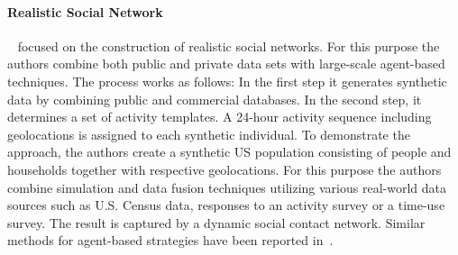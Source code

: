 
\paragraph{Realistic Social Network}
~\cite{Barrett:2009:GAL:1995456.1995598} focused on the construction of
realistic social networks. For this purpose the authors combine both public and
private data sets with large-scale agent-based techniques. The process works as
follows: In the first step it generates  synthetic data by combining public and
commercial databases. In the second step, it determines a set of activity
templates. A 24-hour activity sequence including geolocations is assigned to
each synthetic individual. To demonstrate the approach, the authors create a
synthetic US population consisting of people and households together with
respective geolocations. For this purpose the authors combine simulation and
data fusion techniques utilizing various real-world data sources such as U.S.
Census data, responses to an activity survey or a time-use survey.
The result is captured by a dynamic social contact network. Similar methods for
agent-based strategies have been reported
in~\cite{Bernstein:2013:SAS:2499604.2499609}.

